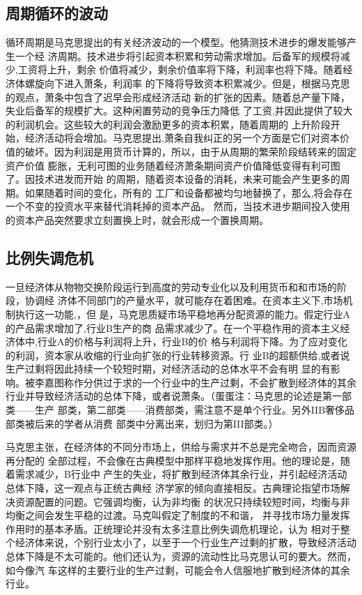 \subsection{周期循环的波动}

循环周期是马克思提出的有关经济波动的一个模型。他猜测技术进步的爆发能够产生一个经
济周期。技术进步将引起资本积累和劳动需求增加。后备军的规模将减少,工资将上升，剩余
价值将减少，剩余价值率将下降，利润率也将下降。随着经济体螺旋向下进入萧条，利润率
的下降将导致资本积累减少。但是，根据马克思的观点，萧条中包含了迟早会形成经济活动
新的扩张的因素。随着总产量下降，失业后备军的规模扩大。这种闲置劳动的竞争压力降低
了工资,并因此提供了较大的利润机会。这些较大的利润会激励更多的资本积累，随着周期的
上升阶段开始，经济活动将会增加。马克思提出,萧条自我纠正的另一个方面是它们对资本价
值的破坏。因为利润是用货币计算的，所以，由于从周期的繁荣阶段结转来的固定资产价值
膨胀，无利可图的业务随着经济萧条期间资产价值降低变得有利可图了。因技术进发而开始
的周期，随着资本设备的消耗，未来可能会产生更多的周期。如果随着时间的变化，所有的
工厂和设备都被均匀地替换了，那么,将会存在一个不变的投资水平来替代消耗掉的资本产品。
然而，当技术进步期间投入使用的资本产品突然要求立刻置换上时，就会形成一个置换周期。

\subsection{比例失调危机}

一旦经济体从物物交换阶段运行到高度的劳动专业化以及利用货币和和市场的阶段，协调经
济体不同部门的产量水平，就可能存在着困难。在资本主义下,市场机制执行这一功能,，但
是，马克思质疑市场平稳地再分配资源的能力。假定行业A的产品需求增加了,行业B生产的商
品需求减少了。在一个平稳作用的资本主义经济体中,行业A的价格与利润将上升，行业B的价
格与利润将下降。为了应对变化的利润，资本家从收缩的行业向扩张的行业转移资源。行
业B的超额供给,或者说生产过剩将因此持续一个较短时期，对经济活动的总体水平不会有明
显的有影响。被李嘉图称作分供过于求的一个行业中的生产过剩，不会扩散到经济体的其余
行业并导致经济活动的总体下降，或者说萧条。（蛋蛋注：马克思的论述是第一部类——生产
部类，第二部类——消费部类，需注意不是单个行业。另外IIB奢侈品部类被后来的学者从消费
部类中分离出来，划归为第III部类。）

马克思主张，在经济体的不同分市场上，供给与需求并不总是完全吻合，因而资源再分配的
全部过程，不会像在古典模型中那样平稳地发挥作用。他的理论是，随着需求减少，B行业中
产生的失业，将扩散到经济体其余行业，并引起经济活动总体下降，这一观点与正统古典经
济学家的倾向直接相反。古典理论指望市场解决资源配置的问题。它强调均衡，认为非均衡
的状况只持续较短时间，均衡与非均衡之间会发生平稳的过渡。马克叫假定了制度的不和谐，
并寻找市场力量发挥作用时的基本矛盾。正统理论并没有太多注意比例失调危机理论，认为
相对于整个经济体来说，个别行业太小了，以至于一个行业生产过剩的扩散，导致经济活动
总体下降是不太可能的。他们还认为，资源的流动性比马克思认可的要大。然而，如今像汽
车这样的主要行业的生产过剩，可能会令人信服地扩散到经济体的其余行业。

